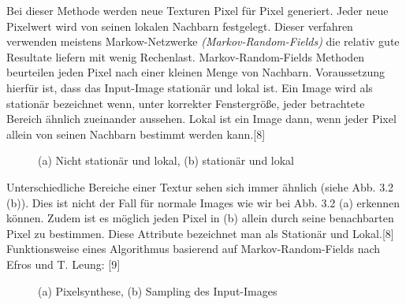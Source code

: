 \documentclass[12pt]{report}
\begin{document}
Bei dieser Methode werden neue Texturen Pixel für Pixel generiert.
Jeder neue Pixelwert wird von seinen lokalen Nachbarn festgelegt.
Dieser verfahren verwenden meistens Markow-Netzwerke \textit{(Markov-Random-Fields)} die relativ gute Resultate liefern mit wenig Rechenlast.
Markov-Random-Fields Methoden beurteilen jeden Pixel nach einer kleinen Menge von Nachbarn.
Voraussetzung hierfür ist, dass das Input-Image stationär und lokal ist.
Ein Image wird als stationär bezeichnet wenn, unter korrekter Fenstergröße,
jeder betrachtete Bereich ähnlich zueinander aussehen.
Lokal ist ein Image dann, wenn jeder Pixel allein von seinen Nachbarn bestimmt werden kann.{[8]}

\begin{figure}[H]
    \centering
    \qquad
    \caption{(a) Nicht stationär und lokal, (b) stationär und lokal}%
\end{figure}

Unterschiedliche Bereiche einer Textur sehen sich immer ähnlich {(siehe Abb. 3.2 (b))}.
Dies ist nicht der Fall für normale Images wie wir bei Abb. 3.2 {(a)} erkennen können.
Zudem ist es möglich jeden Pixel in {(b)} allein durch seine benachbarten Pixel zu bestimmen.
Diese Attribute bezeichnet man als Stationär und Lokal.{[8]} \\

Funktionsweise eines Algorithmus basierend auf Markov-Random-Fields nach Efros und T. Leung: {[9]}

\begin{figure}[H]
    \centering
    \qquad
    \caption{(a) Pixelsynthese, (b) Sampling des Input-Images}%
\end{figure}
\end{document}
